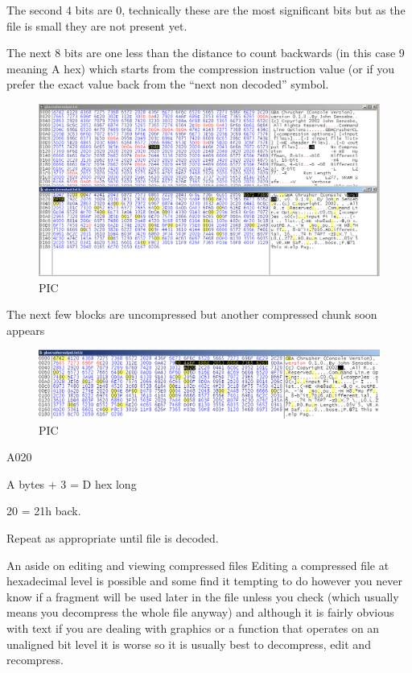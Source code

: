 \documentclass[
]{book}
\begin{document}
The second 4 bits are 0, technically these are the most significant bits but as the file is small they are not present yet.

The next 8 bits are one less than the distance to count backwards (in this case 9 meaning A hex) which starts from the compression instruction value (or if you prefer the exact value back from the ``next non decoded'' symbol.

\begin{figure}
\centering
\includegraphics{images/192_home_fast6191_romhackingguide_unrenamed_fil___omhackingguidecompressionsLZworkedexample_2.png}
\caption{PIC}
\end{figure}

The next few blocks are uncompressed but another compressed chunk soon appears

\begin{figure}
\centering
\includegraphics{images/193_home_fast6191_romhackingguide_unrenamed_fil___omhackingguidecompressionsLZworkedexample_3.png}
\caption{PIC}
\end{figure}

A020

A bytes + 3 = D hex long

20 = 21h back.

Repeat as appropriate until file is decoded.

An aside on editing and viewing compressed files Editing a compressed file at hexadecimal level is possible and some find it tempting to do however you never know if a fragment will be used later in the file unless you check (which usually means you decompress the whole file anyway) and although it is fairly obvious with text if you are dealing with graphics or a function that operates on an unaligned bit level it is worse so it is usually best to decompress, edit and recompress.
\end{document}
